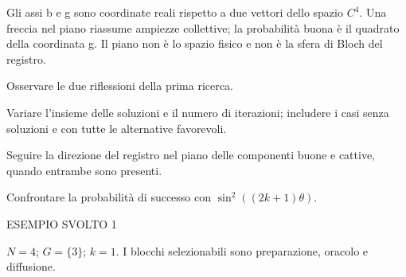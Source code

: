 
Gli assi b e g sono coordinate reali rispetto a due vettori dello spazio \(C^{4}\). Una freccia nel piano riassume ampiezze collettive; la probabilità buona è il quadrato della coordinata g. Il piano non è lo spazio fisico e non è la sfera di Bloch del registro.\par



Osservare le due riflessioni della prima ricerca.\par

Variare l'insieme delle soluzioni e il numero di iterazioni; includere i casi senza soluzioni e con tutte le alternative favorevoli.\par

Seguire la direzione del registro nel piano delle componenti buone e cattive, quando entrambe sono presenti.\par

Confrontare la probabilità di successo con \(\sin ^{2}((2k+1)\theta )\).\par


\Needspace{.36\textheight}\label{c3-grover-primo-example-1}
{\sffamily\small\color{Accent} ESEMPIO SVOLTO 1\par}
\(N=4\); \(G=\{3\}\); \(k=1\). I blocchi selezionabili sono preparazione, oracolo e diffusione.\par



